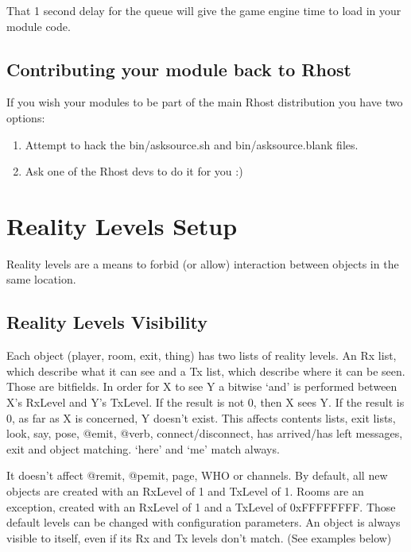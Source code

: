 \documentclass[letterpaper,10pt,english]{sphinxmanual}
\begin{document}
\sphinxAtStartPar
That 1 second delay for the queue will give the game engine time to load in your module code.


\subsection{Contributing your module back to Rhost}
\label{\detokenize{advanced:contributing-your-module-back-to-rhost}}
\sphinxAtStartPar
If you wish your modules to be part of the main Rhost distribution you have two options:
\begin{enumerate}
%
\item {} 
\sphinxAtStartPar
Attempt to hack the bin/asksource.sh and bin/asksource.blank files.

\item {} 
\sphinxAtStartPar
Ask one of the Rhost devs to do it for you :)

\end{enumerate}


\section{Reality Levels Setup}
\label{\detokenize{advanced:reality-levels-setup}}
\sphinxAtStartPar
Reality levels are a means to forbid (or allow) interaction between objects
in the same location.


\subsection{Reality Levels Visibility}
\label{\detokenize{advanced:reality-levels-visibility}}
\sphinxAtStartPar
Each object (player, room, exit, thing) has two lists of reality levels.
An Rx list, which describe what it can see and a Tx list, which describe
where it can be seen. Those are bitfields. In order for X to see Y a bitwise
‘and’ is performed between X’s RxLevel and Y’s TxLevel. If the result is not
0, then X sees Y. If the result is 0, as far as X is concerned, Y doesn’t
exist. This affects contents lists, exit lists, look, say, pose, @emit,
@verb, connect/disconnect, has arrived/has left messages, exit and object
matching. ‘here’ and ‘me’ match always.

\sphinxAtStartPar
It doesn’t affect @remit, @pemit, page, WHO or channels.
By default, all new objects are created with an RxLevel of 1 and TxLevel of
1. Rooms are an exception, created with an RxLevel of 1 and a TxLevel of
0xFFFFFFFF. Those default levels can be changed with configuration
parameters.
An object is always visible to itself, even if its Rx and Tx levels don’t
match. (See examples below)
\end{document}
